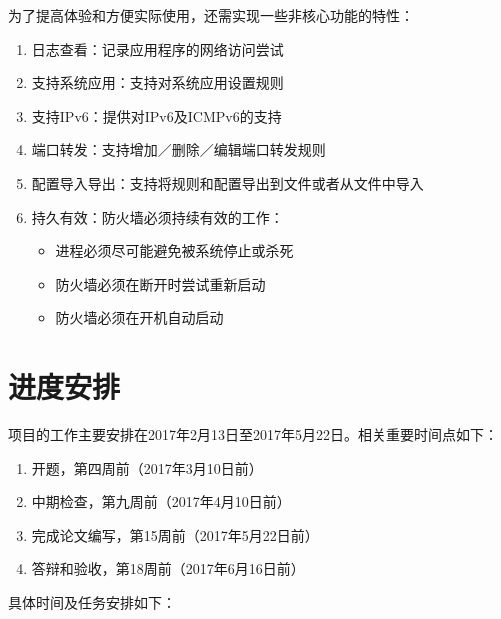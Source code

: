 \documentclass[format=final, language=chinese, degree=bachelor]{hustthesis}
\begin{document}
为了提高体验和方便实际使用，还需实现一些非核心功能的特性：
\begin{enumerate}
	\item 日志查看：记录应用程序的网络访问尝试
	\item 支持系统应用：支持对系统应用设置规则
	\item 支持IPv6：提供对IPv6及ICMPv6的支持
	\item 端口转发：支持增加／删除／编辑端口转发规则
	\item 配置导入导出：支持将规则和配置导出到文件或者从文件中导入
	\item 持久有效：防火墙必须持续有效的工作：\begin{itemize}
		\item 进程必须尽可能避免被系统停止或杀死
		\item 防火墙必须在断开时尝试重新启动
		\item 防火墙必须在开机自动启动
	\end{itemize}
\end{enumerate}


\section{进度安排}

项目的工作主要安排在2017年2月13日至2017年5月22日。相关重要时间点如下：
\begin{enumerate}
	\item 开题，第四周前（2017年3月10日前）
	\item 中期检查，第九周前（2017年4月10日前）
	\item 完成论文编写，第15周前（2017年5月22日前）
	\item 答辩和验收，第18周前（2017年6月16日前）
\end{enumerate}

具体时间及任务安排如下：
\end{document}
